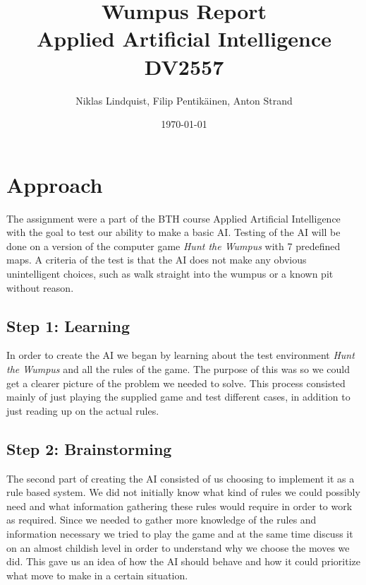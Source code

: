 \documentclass[a4paper,11pt]{article}
\begin{document}
\title{Wumpus Report \\ Applied Artificial Intelligence \\ DV2557}
\author{Niklas Lindquist, Filip Pentikäinen, Anton Strand}
\date{\today}
\maketitle

\section{Approach}
The assignment were a part of the BTH course Applied Artificial Intelligence with the goal to test our ability to make a basic AI. Testing of the AI will be done on a version of the computer game \textit{Hunt the Wumpus} with 7 predefined maps. A criteria of the test is that the AI does not make any obvious unintelligent choices, such as walk straight into the wumpus or a known pit without reason.

\subsection{Step 1: Learning}
In order to create the AI we began by learning about the test environment \textit{Hunt the Wumpus} and all the rules of the game. The purpose of this was so we could get a clearer picture of the problem we needed to solve. This process consisted mainly of just playing the supplied game and test different cases, in addition to just reading up on the actual rules.

\subsection{Step 2: Brainstorming}
The second part of creating the AI consisted of us choosing to implement it as a rule based system. We did not initially know what kind of rules we could possibly need and what information gathering these rules would require in order to work as required. Since we needed to gather more knowledge of the rules and information necessary we tried to play the game and at the same time discuss it on an almost childish level in order to understand why we choose the moves we did. This gave us an idea of how the AI should behave and how it could prioritize what move to make in a certain situation. 
\end{document}

